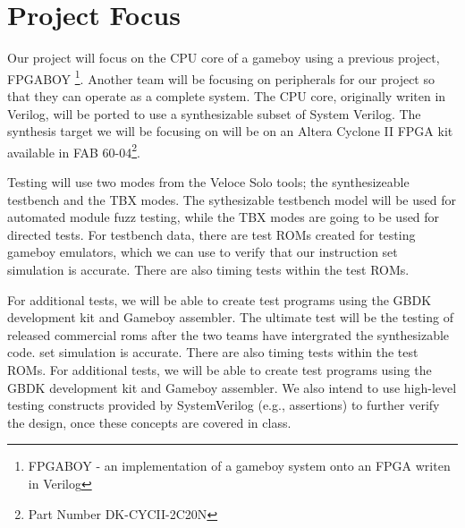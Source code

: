 \section{Project Focus}
Our project will focus on the CPU core of a gameboy using a previous project,
FPGABOY \footnote{FPGABOY - an implementation of a gameboy system onto an FPGA 
writen in Verilog}. Another team will be focusing on peripherals for our project 
so that they can operate as a complete system. The CPU core, originally writen 
in Verilog, will be ported to use a synthesizable subset of System Verilog.
The synthesis target we will be focusing on will be on an Altera Cyclone II 
FPGA kit available in FAB 60-04\footnote{Part Number DK-CYCII-2C20N}.

Testing will use two modes from the Veloce Solo tools; the synthesizeable 
testbench and the TBX modes. The sythesizable testbench model will be used for 
automated module fuzz testing, while the TBX modes are going to be used for 
directed tests. For testbench data, there are test ROMs created 
for testing gameboy emulators, which we can use to verify that our instruction 
set simulation is accurate. There are also timing tests within the test ROMs. 

For additional tests, we will be able to create test programs using the GBDK 
development kit and Gameboy assembler. The ultimate test will be the testing 
of released commercial roms after the two teams have intergrated the 
synthesizable code. set simulation is accurate. There are also timing tests 
within the test ROMs. For additional tests, we will be able to create test 
programs using the GBDK development kit and Gameboy assembler.
We also intend to use high-level testing constructs provided by SystemVerilog 
(e.g., assertions) to further verify the design, once these concepts are 
covered in class. 

